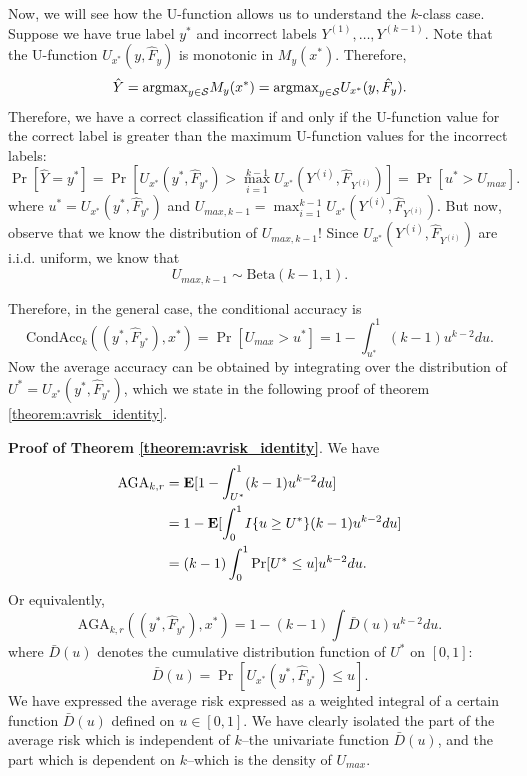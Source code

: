 \documentclass[12pt]{article}
\begin{document}
Now, we will see how the U-function allows us to understand the
$k$-class case.  Suppose we have true label $y^*$ and incorrect labels
$Y^{(1)},\hdots, Y^{(k-1)}$.  Note that the U-function
$U_{x^*}(y, \hat{F}_y)$ is monotonic in $M_y(x^*)$.  Therefore,
\[
\hat{Y} = \text{argmax}_{y \in \mathcal{S}} M_y(x^*) = \text{argmax}_{y \in \mathcal{S}} U_{x^*}(y, \hat{F}_y).
\]
Therefore, we have a correct classification if and only if the U-function value for the correct label
is greater than the maximum U-function values for the incorrect labels:
\[
\Pr[\hat{Y} = y^*] = \Pr[U_{x^*}(y^*, \hat{F}_{y^*}) > \max_{i=1}^{k-1} U_{x^*}(Y^{(i)}, \hat{F}_{Y^{(i)}})] =  \Pr[u^* > U_{max}].
\]
where $u^* = U_{x^*}(y^*, \hat{F}_{y^*})$ and $U_{max, k-1}
= \max_{i=1}^{k-1} U_{x^*}(Y^{(i)}, \hat{F}_{Y^{(i)}})$.  But now,
observe that we know the distribution of $U_{max, k-1}$!  Since
$U_{x^*}(Y^{(i)}, \hat{F}_{Y^{(i)}})$ are i.i.d. uniform, we know that
\begin{equation}\label{eq:umax_beta}
U_{max, k-1} \sim \text{Beta}(k-1, 1). 
\end{equation}

Therefore, in the general case, the conditional accuracy is
\[
\text{CondAcc}_k((y^*, \hat{F}_{y^*}), x^*) = \Pr[U_{max} > u^*] = 1 - \int_{u^*}^1 (k-1) u^{k-2} du.
\]
Now the average accuracy can be obtained by integrating over the
distribution of $U^* = U_{x^*}(y^*, \hat{F}_{y^*})$, which we state in
the following proof of theorem \ref{theorem:avrisk_identity}.

\noindent\textbf{Proof of Theorem \ref{theorem:avrisk_identity}}.
We have
\begin{align*}
\text{AGA}_{k,r} &= \textbf{E}[ 1 - \int_{U^*}^1 (k-1) u^{k-2} du] 
\\&= 1 - \textbf{E}[\int_0^1 I\{u \geq U^*\} (k-1) u^{k-2} du ]
\\&= (k-1) \int_0^1 \Pr[U^* \leq u] u^{k-2} du.
\end{align*}
Or equivalently,
\[
\text{AGA}_{k, r}((y^*, \hat{F}_{y^*}), x^*) = 1 - (k-1) \int \bar{D}(u) u^{k-2} du.
\]
where $\bar{D}(u)$ denotes the cumulative distribution function of $U^*$ on $[0,1]$:
\begin{equation}\label{eq:Kbar}
\bar{D}(u) = \Pr[U_{x^*}(y^*, \hat{F}_{y^*}) \leq u].
\end{equation}
We have expressed the average risk expressed as a weighted integral of
a certain function $\bar{D}(u)$ defined on $u \in [0,1]$.  We have
clearly isolated the part of the average risk which is independent of
$k$--the univariate function $\bar{D}(u)$, and the part which is
dependent on $k$--which is the density of $U_{max}$.
\end{document}
